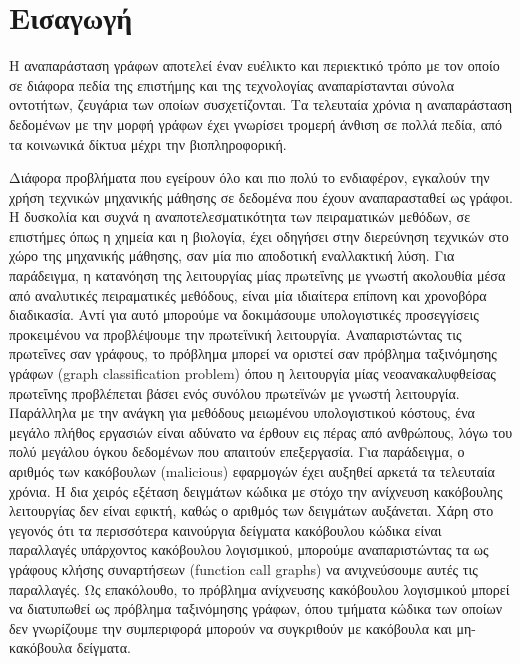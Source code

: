 \mainmatter
\chapter{Εισαγωγή}
\label{chap1}



Η αναπαράσταση γράφων αποτελεί έναν ευέλικτο και περιεκτικό τρόπο με τον οποίο σε διάφορα πεδία της επιστήμης και της τεχνολογίας αναπαρίστανται σύνολα οντοτήτων, ζευγάρια των οποίων συσχετίζονται.
Τα τελευταία χρόνια η αναπαράσταση δεδομένων με την μορφή γράφων έχει γνωρίσει τρομερή άνθιση σε πολλά πεδία, από τα κοινωνικά δίκτυα μέχρι την βιοπληροφορική.\par
Διάφορα προβλήματα που εγείρουν όλο και πιο πολύ το ενδιαφέρον, εγκαλούν την χρήση τεχνικών μηχανικής μάθησης σε δεδομένα που έχουν αναπαρασταθεί ως γράφοι.
Η δυσκολία και συχνά η αναποτελεσματικότητα των πειραματικών μεθόδων, σε επιστήμες όπως η χημεία και η βιολογία, έχει οδηγήσει στην διερεύνηση τεχνικών στο χώρο της μηχανικής μάθησης, σαν μία πιο αποδοτική εναλλακτική λύση. Για παράδειγμα, η κατανόηση της λειτουργίας μίας πρωτεΐνης με γνωστή ακολουθία μέσα από αναλυτικές πειραματικές μεθόδους, είναι μία ιδιαίτερα επίπονη και χρονοβόρα διαδικασία.
Αντί για αυτό μπορούμε να δοκιμάσουμε υπολογιστικές προσεγγίσεις προκειμένου να προβλέψουμε την πρωτεϊνική λειτουργία.
Αναπαριστώντας τις πρωτεΐνες σαν γράφους, το πρόβλημα μπορεί να οριστεί σαν πρόβλημα ταξινόμησης γράφων (graph classification problem) όπου η λειτουργία μίας νεοανακαλυφθείσας πρωτεΐνης προβλέπεται βάσει ενός συνόλου πρωτεϊνών με γνωστή λειτουργία. 
Παράλληλα με την ανάγκη για μεθόδους μειωμένου υπολογιστικού κόστους, ένα μεγάλο πλήθος εργασιών είναι αδύνατο να έρθουν εις πέρας από ανθρώπους, λόγω του πολύ μεγάλου όγκου δεδομένων που απαιτούν επεξεργασία.
Για παράδειγμα, ο αριθμός των κακόβουλων (malicious) εφαρμογών έχει αυξηθεί αρκετά τα τελευταία χρόνια.
Η δια χειρός εξέταση δειγμάτων κώδικα με στόχο την ανίχνευση κακόβουλης λειτουργίας δεν είναι εφικτή, καθώς ο αριθμός των δειγμάτων αυξάνεται. 
Χάρη στο γεγονός ότι τα περισσότερα καινούργια δείγματα κακόβουλου κώδικα είναι παραλλαγές υπάρχοντος κακόβουλου λογισμικού, μπορούμε αναπαριστώντας τα ως γράφους κλήσης συναρτήσεων (function call graphs) να ανιχνεύσουμε αυτές τις παραλλαγές.
Ως επακόλουθο, το πρόβλημα ανίχνευσης κακόβουλου λογισμικού μπορεί να διατυπωθεί ως πρόβλημα ταξινόμησης γράφων, όπου τμήματα κώδικα των οποίων δεν γνωρίζουμε την συμπεριφορά μπορούν να συγκριθούν με κακόβουλα και μη-κακόβουλα δείγματα. \par
